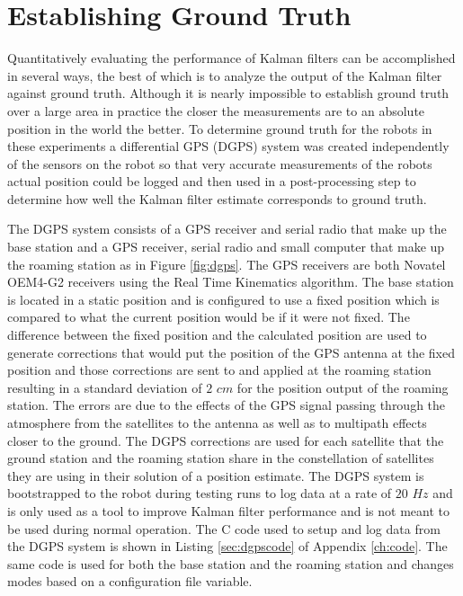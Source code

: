 \section{Establishing Ground Truth}
\label{sec:groundtruth}
Quantitatively evaluating the performance of Kalman filters can be accomplished in several ways, the best of which is to analyze the output of the Kalman filter against ground truth. Although it is nearly impossible to establish ground truth over a large area in practice the closer the measurements are to an absolute position in the world the better. To determine ground truth for the robots in these experiments a differential GPS (DGPS) system was created independently of the sensors on the robot so that very accurate measurements of the robots actual position could be logged and then used in a post-processing step to determine how well the Kalman filter estimate corresponds to ground truth.

The DGPS system consists of a GPS receiver and serial radio that make up the base station and a GPS receiver, serial radio and small computer that make up the roaming station as in Figure \ref{fig:dgps}. The GPS receivers are both Novatel OEM4-G2 receivers using the Real Time Kinematics algorithm. The base station is located in a static position and is configured to use a fixed position which is compared to what the current position would be if it were not fixed. The difference between the fixed position and the calculated position are used to generate corrections that would put the position of the GPS antenna at the fixed position and those corrections are sent to and applied at the roaming station resulting in a standard deviation of $2$ $cm$ for the position output of the roaming station. The errors are due to the effects of the GPS signal passing through the atmosphere from the satellites to the antenna as well as to multipath effects closer to the ground. The DGPS corrections are used for each satellite that the ground station and the roaming station share in the constellation of satellites they are using in their solution of a position estimate. The DGPS system is bootstrapped to the robot during testing runs to log data at a rate of $20$ $Hz$ and is only used as a tool to improve Kalman filter performance and is not meant to be used during normal operation. The C code used to setup and log data from the DGPS system is shown in Listing \ref{sec:dgpscode} of Appendix \ref{ch:code}. The same code is used for both the base station and the roaming station and changes modes based on a configuration file variable.

